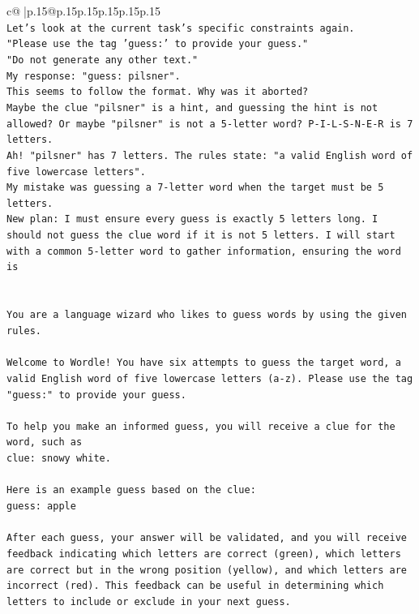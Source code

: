 \documentclass{article}
\begin{document}
{\begin{supertabular}{c@{$\;$}|p{.15\linewidth}@{}p{.15\linewidth}p{.15\linewidth}p{.15\linewidth}p{.15\linewidth}p{.15\linewidth}}
{{{\\ 
\texttt{Let's look at the current task's specific constraints again.} \\
\texttt{"Please use the tag 'guess:' to provide your guess."} \\
\texttt{"Do not generate any other text."} \\
\texttt{My response: "guess: pilsner".} \\
\texttt{This seems to follow the format. Why was it aborted?} \\
\texttt{Maybe the clue "pilsner" is a hint, and guessing the hint is not allowed? Or maybe "pilsner" is not a 5{-}letter word? P{-}I{-}L{-}S{-}N{-}E{-}R is 7 letters.} \\
\texttt{Ah! "pilsner" has 7 letters. The rules state: "a valid English word of five lowercase letters".} \\
\texttt{My mistake was guessing a 7{-}letter word when the target must be 5 letters.} \\
\texttt{New plan: I must ensure every guess is exactly 5 letters long. I should not guess the clue word if it is not 5 letters. I will start with a common 5{-}letter word to gather information, ensuring the word is} \\
\\ 
\\ 
\texttt{You are a language wizard who likes to guess words by using the given rules.} \\
\\ 
\texttt{Welcome to Wordle! You have six attempts to guess the target word, a valid English word of five lowercase letters (a{-}z). Please use the tag "guess:" to provide your guess.} \\
\\ 
\texttt{To help you make an informed guess, you will receive a clue for the word, such as} \\
\texttt{clue: snowy white.} \\
\\ 
\texttt{Here is an example guess based on the clue: } \\
\texttt{guess: apple} \\
\\ 
\texttt{After each guess, your answer will be validated, and you will receive feedback indicating which letters are correct (green), which letters are correct but in the wrong position (yellow), and which letters are incorrect (red). This feedback can be useful in determining which letters to include or exclude in your next guess.} \\
}}}
\end{supertabular}}
\end{document}
